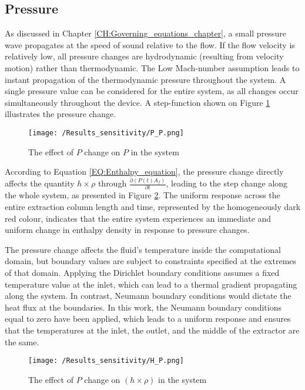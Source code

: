 \documentclass[../Article_Sensitivity_Analsysis.tex]{subfiles}
\begin{document}
	
	\subsection{Pressure}
	
	As discussed in Chapter \ref{CH:Governing_equations_chapter}, a small pressure wave propagates at the speed of sound relative to the flow. If the flow velocity is relatively low, all pressure changes are hydrodynamic (resulting from velocity motion) rather than thermodynamic. The Low Mach-number assumption leads to instant propagation of the thermodynamic pressure throughout the system. A single pressure value can be considered for the entire system, as all changes occur simultaneously throughout the device. A step-function shown on Figure \ref{fig:Sensitivty_P_P} illustrates the pressure change.
	
	\begin{figure}[h!]
		\centering
		\texttt{[image: /Results\_sensitivity/P\_P.png]}
		\caption{The effect of $P$ change on $P$ in the system}
		\label{fig:Sensitivty_P_P}
	\end{figure}
	
	
	According to Equation \ref{EQ:Enthalpy_equation}, the pressure change directly affects the quantity $h \times \rho$ through $\frac{\partial (P(t) A_f)}{\partial t}$, leading to the step change along the whole system, as presented in Figure \ref{fig:Sensitivty_P_H}. The uniform response across the entire extraction column length and time, represented by the homogeneously dark red colour, indicates that the entire system experiences an immediate and uniform change in enthalpy density in response to pressure changes. 
	
	The pressure change affects the fluid's temperature inside the computational domain, but boundary values are subject to constraints specified at the extremes of that domain. Applying the Dirichlet boundary conditions assumes a fixed temperature value at the inlet, which can lead to a thermal gradient propagating along the system. In contrast, Neumann boundary conditions would dictate the heat flux at the boundaries. In this work, the Neumann boundary conditions equal to zero have been applied, which leads to a uniform response and ensures that the temperatures at the inlet, the outlet, and the middle of the extractor are the same.
	
	\begin{figure}[h!]
		\centering
		\texttt{[image: /Results\_sensitivity/H\_P.png]}
		\caption{The effect of $P$ change on $(h \times \rho)$ in the system}
		\label{fig:Sensitivty_P_H}
	\end{figure}
	
\end{document}
